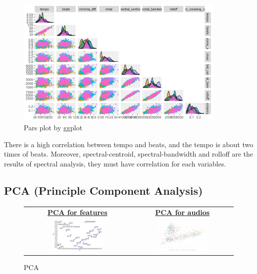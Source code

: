 \documentclass[12pt,a4paper]{article}
\begin{document}
\begin{figure}[h]
    \includegraphics[width=0.9\textwidth]{ggpairs1.png}
    \caption{Pars plot by ggplot}
\end{figure}
There is a high correlation between tempo and beats, and the tempo is about two times of beats. Moreover, spectral-centroid, spectral-bandwidth and rolloff are the results of spectral analysis, they must have correlation for each variables. 


\subsection{PCA (Principle Component Analysis)}
\begin{figure}[h]
\centering
    \begin{tabular}{c c}
        \textbf{\underline{PCA for features}} & \textbf{\underline{PCA for audios}} \\
        \includegraphics[width=0.5\textwidth]{pca_feat.png} & \includegraphics[width=0.5\textwidth]{pca.png}
    \end{tabular}
\caption{PCA}
\end{figure}
\end{document}
